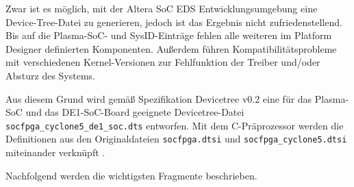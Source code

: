 Zwar ist es möglich, mit der Altera SoC EDS Entwicklungsumgebung eine Device-Tree-Datei zu generieren, jedoch ist das Ergebnis nicht zufriedenstellend. Bis auf die Plasma-\gls{SoC}- und SysID-Einträge fehlen alle weiteren im Platform Designer definierten Komponenten. Außerdem führen Kompatibilitätsprobleme mit verschiedenen Kernel-Versionen zur Fehlfunktion der Treiber und/oder Absturz des Systems. 

Aus diesem Grund wird gemäß Spezifikation Devicetree v0.2 \cite{manual:devicetree_specification} eine für das Plasma-\gls{SoC} und das DE1-SoC-Board geeignete Devicetree-Datei \texttt{socfpga\_cyclone5\_de1\_soc.dts} entworfen. Mit dem C-Präprozessor werden die Definitionen aus den Originaldateien \texttt{socfpga.dtsi} und \texttt{socfpga\_cyclone5.dtsi} miteinander verknüpft \cite[Version~4.9.78-ltsi, \texttt{arch/arm/boot/dts/}]{website:linux_socfpga_repository}. 


Nachfolgend werden die wichtigsten Fragmente beschrieben. 

%
%	


